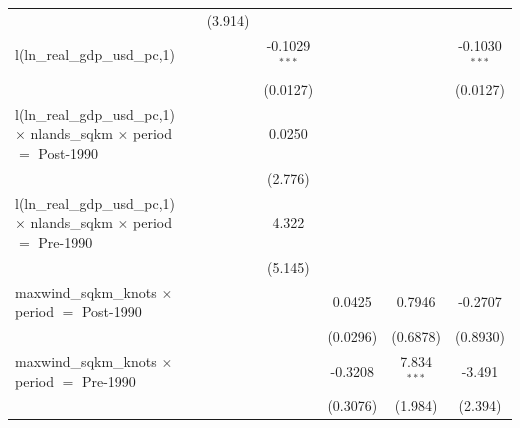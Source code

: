 \begin{tabular}{lcccccc}
                                                                                                   &             & (3.914)                 &                 &          &                         &   \\   
   l(ln\_real\_gdp\_usd\_pc,1)                                                                     &             &                         & -0.1029$^{***}$ &          &                         & -0.1030$^{***}$\\   
                                                                                                   &             &                         & (0.0127)        &          &                         & (0.0127)\\   
   l(ln\_real\_gdp\_usd\_pc,1) $\times$ nlands\_sqkm $\times$ period $=$ Post-1990                 &             &                         & 0.0250          &          &                         &   \\   
                                                                                                   &             &                         & (2.776)         &          &                         &   \\   
   l(ln\_real\_gdp\_usd\_pc,1) $\times$ nlands\_sqkm $\times$ period $=$ Pre-1990                  &             &                         & 4.322           &          &                         &   \\   
                                                                                                   &             &                         & (5.145)         &          &                         &   \\   
   maxwind\_sqkm\_knots $\times$ period $=$ Post-1990                                              &             &                         &                 & 0.0425   & 0.7946                  & -0.2707\\   
                                                                                                   &             &                         &                 & (0.0296) & (0.6878)                & (0.8930)\\   
   maxwind\_sqkm\_knots $\times$ period $=$ Pre-1990                                               &             &                         &                 & -0.3208  & 7.834$^{***}$           & -3.491\\   
                                                                                                   &             &                         &                 & (0.3076) & (1.984)                 & (2.394)\\   

\end{tabular}
